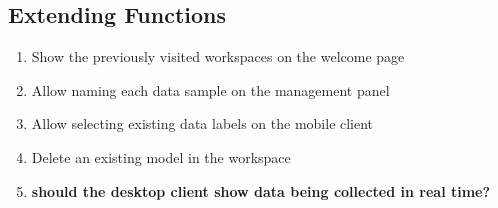 \subsection{Extending Functions}
\begin{enumerate}[resume*]
    \item Show the previously visited workspaces on the welcome page
    \item Allow naming each data sample on the management panel
    \item Allow selecting existing data labels on the mobile client %
    \item Delete an existing model in the workspace %
    \item \textbf{should the desktop client show data being collected in real time?}
\end{enumerate}